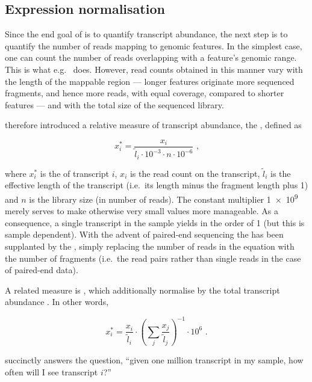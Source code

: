 \subsection{Expression normalisation}

Since the end goal of \rnaseq is to quantify transcript abundance, the next step
is to quantify the number of reads mapping to genomic features. In the simplest
case, one can count the number of reads overlapping with a feature’s genomic
range. This is what e.g.\  \citep{Anders:2014} does. However, read
counts obtained in this manner vary with the length of the mappable region ---
longer features originate more sequenced fragments, and hence more reads, with
equal coverage, compared to shorter features --- and with the total size of the
sequenced library.

\cite{Mortazavi:2008} therefore introduced a relative measure of transcript
abundance, the \rpkm, defined as

\begin{equation}
    x^*_i = \frac{x_i}{\tilde l_i \cdot 10^{-3} \cdot n \cdot 10^{-6}}
        \text{\ ,}
\end{equation}

where \(x^*_i\) is the \rpkm of transcript \(i\), \(x_i\) is the read count on
the transcript, \(\tilde l_i\) is the effective length of the transcript (i.e.\
its length minus the fragment length plus \num{1}) and \(n\) is the library size
(in number of reads). The constant multiplier \num{1e9} merely serves to make
otherwise very small values more manageable. As a consequence, a single
transcript in the sample yields in the order of \SI{1}{\rpkm} (but this is
sample dependent). With the advent of paired-end sequencing the \rpkm has been
supplanted by the \fpkm, simply replacing the number of reads in the equation
with the number of fragments (i.e.\ the read pairs rather than single reads in
the case of paired-end data).

A related measure is \tpm, which additionally normalise by the total transcript
abundance \citep{Li:2010}. In other words,

\begin{equation}
    x^*_i = \frac{x_i}{\tilde l_i} \cdot \left(\sum_j{\frac{x_j}{\tilde
        l_j}}\right)^{-1} \cdot 10^6 \text{\ .}
\end{equation}

\tpm succinctly answers the question, “given one million transcript in my
sample, how often will I see transcript \(i\)?”

